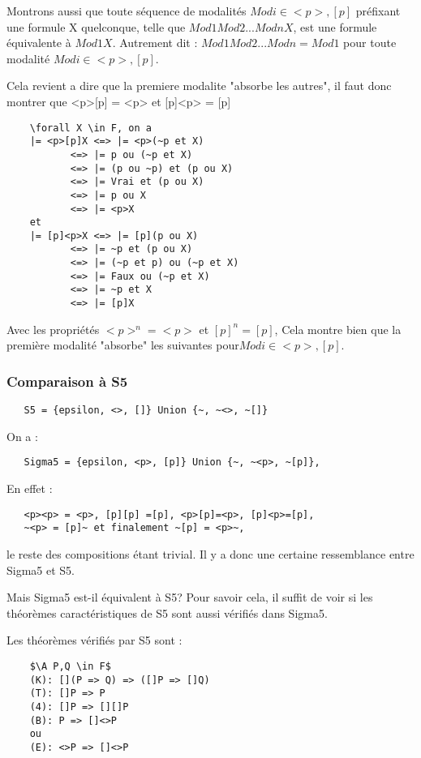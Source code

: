 \documentclass[a4paper,10pt]{article}
\begin{document}
   Montrons aussi que toute séquence de modalités $Modi \in {<p>, [p]}$ préfixant une formule X quelconque, 
   telle que $Mod1 Mod2 ... Modn X$, est une formule équivalente à $Mod1 X$.
   Autrement dit :  $Mod1 Mod2 ... Modn  =  Mod1$   pour toute modalité $Modi \in {<p>, [p]}$.
   
   
   Cela revient a dire que la premiere modalite "absorbe les autres", 
   il faut donc montrer que <p>[p] = <p> et [p]<p> = [p]
   \begin{lstlisting}
	\forall X \in F, on a
	|= <p>[p]X <=> |= <p>(~p et X)
		   <=> |= p ou (~p et X)
		   <=> |= (p ou ~p) et (p ou X)
		   <=> |= Vrai et (p ou X)
		   <=> |= p ou X
		   <=> |= <p>X 
	et
	|= [p]<p>X <=> |= [p](p ou X)
		   <=> |= ~p et (p ou X)
		   <=> |= (~p et p) ou (~p et X)
		   <=> |= Faux ou (~p et X)
		   <=> |= ~p et X
		   <=> |= [p]X
   \end{lstlisting}
   
   Avec les propriétés $<p>^n = <p>$ et $[p]^n = [p]$, Cela montre bien que la première modalité "absorbe" les suivantes pour$ Modi \in {<p>, [p]}$.
   
   \subsubsection{Comparaison \`{a} S5}
   
   \begin{lstlisting}
   S5 = {epsilon, <>, []} Union {~, ~<>, ~[]}
   \end{lstlisting}
   
   On a :
   \begin{lstlisting}
   Sigma5 = {epsilon, <p>, [p]} Union {~, ~<p>, ~[p]},
   \end{lstlisting}
   En effet :
   \begin{lstlisting}
   <p><p> = <p>, [p][p] =[p], <p>[p]=<p>, [p]<p>=[p], 
   ~<p> = [p]~ et finalement ~[p] = <p>~,
   \end{lstlisting}
   
   le reste des compositions étant trivial.
   Il y a donc une certaine ressemblance entre Sigma5 et S5. 
   
   
   Mais Sigma5 est-il équivalent à S5? Pour savoir cela, 
   il suffit de voir si les théorèmes caractéristiques de S5 sont aussi vérifiés dans Sigma5.
   
   Les théorèmes vérifiés par S5 sont :
   \begin{lstlisting}
	$\A P,Q \in F$
	(K): [](P => Q) => ([]P => []Q)
	(T): []P => P
	(4): []P => [][]P
	(B): P => []<>P 
	ou 
	(E): <>P => []<>P
   \end{lstlisting}
   
\end{document}
